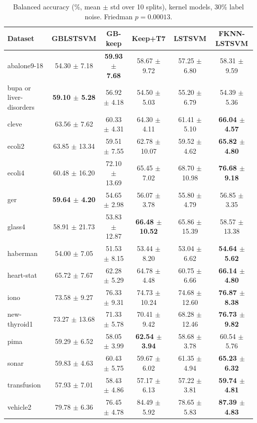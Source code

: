 \begin{table}[t]
\centering\small
\caption{Balanced accuracy (\%, mean $\pm$ std over 10 splits), kernel models, 30\% label noise. Friedman $p = 0.00013$.}
\begin{tabular}{lccccc}
\toprule
Dataset & GBLSTSVM & GB-keep & Keep+T7 & LSTSVM & FKNN-LSTSVM \\
\midrule
abalone9-18 & 54.30 $\pm$ 7.18 & \textbf{59.93 $\pm$ 7.68} & 58.67 $\pm$ 9.72 & 57.25 $\pm$ 6.80 & 58.31 $\pm$ 9.59 \\
bupa or liver-disorders & \textbf{59.10 $\pm$ 5.28} & 56.92 $\pm$ 4.18 & 54.50 $\pm$ 5.03 & 55.20 $\pm$ 6.79 & 54.39 $\pm$ 5.36 \\
cleve & 63.56 $\pm$ 7.62 & 60.33 $\pm$ 4.31 & 64.30 $\pm$ 4.11 & 61.41 $\pm$ 5.10 & \textbf{66.04 $\pm$ 4.57} \\
ecoli2 & 63.85 $\pm$ 13.34 & 59.51 $\pm$ 7.55 & 62.78 $\pm$ 10.07 & 59.52 $\pm$ 4.62 & \textbf{65.82 $\pm$ 4.80} \\
ecoli4 & 60.48 $\pm$ 16.20 & 72.10 $\pm$ 13.69 & 65.45 $\pm$ 7.02 & 68.70 $\pm$ 10.98 & \textbf{76.68 $\pm$ 9.18} \\
ger & \textbf{59.64 $\pm$ 4.20} & 54.65 $\pm$ 2.98 & 56.07 $\pm$ 3.78 & 55.80 $\pm$ 4.79 & 56.85 $\pm$ 3.35 \\
glass4 & 58.91 $\pm$ 21.73 & 53.83 $\pm$ 12.87 & \textbf{66.48 $\pm$ 10.52} & 65.86 $\pm$ 15.39 & 58.57 $\pm$ 13.38 \\
haberman & 54.00 $\pm$ 7.05 & 51.53 $\pm$ 8.15 & 53.44 $\pm$ 8.20 & 53.04 $\pm$ 6.62 & \textbf{54.64 $\pm$ 5.62} \\
heart-stat & 65.72 $\pm$ 7.67 & 62.28 $\pm$ 5.29 & 64.78 $\pm$ 4.48 & 60.75 $\pm$ 6.66 & \textbf{66.14 $\pm$ 4.80} \\
iono & 73.58 $\pm$ 9.27 & 76.33 $\pm$ 9.31 & 74.73 $\pm$ 10.24 & 74.68 $\pm$ 12.60 & \textbf{76.87 $\pm$ 8.38} \\
new-thyroid1 & 73.27 $\pm$ 13.68 & 71.33 $\pm$ 5.78 & 70.41 $\pm$ 9.42 & 68.28 $\pm$ 12.46 & \textbf{76.73 $\pm$ 9.82} \\
pima & 59.29 $\pm$ 6.52 & 58.05 $\pm$ 3.99 & \textbf{62.54 $\pm$ 3.94} & 58.68 $\pm$ 3.78 & 60.54 $\pm$ 5.76 \\
sonar & 59.83 $\pm$ 4.63 & 60.43 $\pm$ 5.75 & 59.67 $\pm$ 6.02 & 61.35 $\pm$ 4.94 & \textbf{65.23 $\pm$ 6.32} \\
transfusion & 57.93 $\pm$ 7.01 & 58.43 $\pm$ 4.86 & 57.17 $\pm$ 6.13 & 57.22 $\pm$ 3.81 & \textbf{59.74 $\pm$ 4.81} \\
vehicle2 & 79.78 $\pm$ 6.36 & 76.45 $\pm$ 4.78 & 84.49 $\pm$ 5.92 & 78.65 $\pm$ 5.83 & \textbf{87.39 $\pm$ 4.83} \\

\end{tabular}
\end{table}
